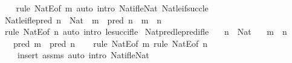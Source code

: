 \begin{isabellebody}
%
\isadelimproof
\ \ %
\endisadelimproof
%
\isatagproof
{}\isamarkupfalse%
\ {\isacharparenleft}{\kern0pt}rule\ NatE{\isacharbrackleft}{\kern0pt}of\ m{\isacharbrackright}{\kern0pt}{\isacharparenright}{\kern0pt}\ {\isacharparenleft}{\kern0pt}auto\ intro{\isacharcolon}{\kern0pt}\ Nat{\isacharunderscore}{\kern0pt}if{\isacharunderscore}{\kern0pt}le{\isacharunderscore}{\kern0pt}Nat\ Nat{\isacharunderscore}{\kern0pt}le{\isacharunderscore}{\kern0pt}if{\isacharunderscore}{\kern0pt}succ{\isacharunderscore}{\kern0pt}le{\isacharparenright}{\kern0pt}%
\endisatagproof
{\isafoldproof}%
%
\isadelimproof
\isanewline
%
\endisadelimproof
\isanewline
{}\isamarkupfalse%
\ Nat{\isacharunderscore}{\kern0pt}le{\isacharunderscore}{\kern0pt}if{\isacharunderscore}{\kern0pt}le{\isacharunderscore}{\kern0pt}pred{\isacharcolon}{\kern0pt}\ {\isachardoublequoteopen}n\ {\isacharcolon}{\kern0pt}\ Nat\ {\isasymLongrightarrow}\ m\ {\isasymle}\ pred\ n\ {\isasymLongrightarrow}\ m\ {\isasymle}\ n{\isachardoublequoteclose}\isanewline
%
\isadelimproof
\ \ %
\endisadelimproof
%
\isatagproof
{}\isamarkupfalse%
\ {\isacharparenleft}{\kern0pt}rule\ NatE{\isacharbrackleft}{\kern0pt}of\ n{\isacharbrackright}{\kern0pt}{\isacharparenright}{\kern0pt}\ {\isacharparenleft}{\kern0pt}auto\ intro{\isacharcolon}{\kern0pt}\ le{\isacharunderscore}{\kern0pt}succ{\isacharunderscore}{\kern0pt}if{\isacharunderscore}{\kern0pt}le{\isacharparenright}{\kern0pt}%
\endisatagproof
{\isafoldproof}%
%
\isadelimproof
\isanewline
%
\endisadelimproof
\isanewline
{}\isamarkupfalse%
\ Nat{\isacharunderscore}{\kern0pt}pred{\isacharunderscore}{\kern0pt}le{\isacharunderscore}{\kern0pt}pred{\isacharunderscore}{\kern0pt}if{\isacharunderscore}{\kern0pt}le{\isacharcolon}{\kern0pt}\isanewline
\ \ \ {\isachardoublequoteopen}n\ {\isacharcolon}{\kern0pt}\ Nat{\isachardoublequoteclose}\isanewline
\ \ \ {\isachardoublequoteopen}m\ {\isasymle}\ n{\isachardoublequoteclose}\isanewline
\ \ \ {\isachardoublequoteopen}pred\ m\ {\isasymle}\ pred\ n{\isachardoublequoteclose}\isanewline
%
\isadelimproof
\ \ %
\endisadelimproof
%
\isatagproof
{}\isamarkupfalse%
\ {\isacharparenleft}{\kern0pt}rule\ NatE{\isacharbrackleft}{\kern0pt}of\ m{\isacharbrackright}{\kern0pt}{\isacharsemicolon}{\kern0pt}\ rule\ NatE{\isacharbrackleft}{\kern0pt}of\ n{\isacharbrackright}{\kern0pt}{\isacharparenright}{\kern0pt}\isanewline
\ \ \ \ {\isacharparenleft}{\kern0pt}insert\ assms{\isacharcomma}{\kern0pt}\ auto\ intro{\isacharcolon}{\kern0pt}\ Nat{\isacharunderscore}{\kern0pt}if{\isacharunderscore}{\kern0pt}le{\isacharunderscore}{\kern0pt}Nat{\isacharparenright}{\kern0pt}%

\end{isabellebody}
